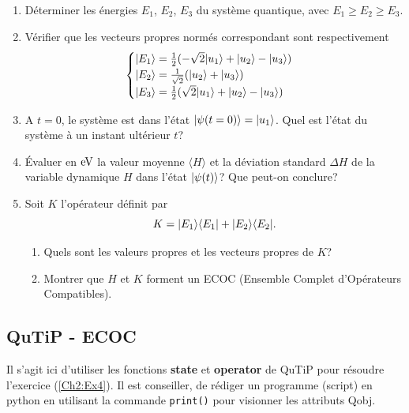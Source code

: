 \begin{enumerate}
\item Déterminer les énergies $E_1$, $E_{2}$, $E_3$ du système quantique,
avec $E_1\geq E_{2}\geq E_3$.

\item Vérifier que les vecteurs propres normés correspondant sont
respectivement%
\begin{equation}
\begin{cases}
\vert E_1\rangle=\frac{1}{2}(-\sqrt{2}\vert u_1\rangle +\vert u_{2}\rangle-\vert u_3\rangle) \\
\vert E_{2}\rangle=\frac{1}{\sqrt{2}}(\vert u_{2}\rangle+\vert u_3\rangle) \\
\vert E_3\rangle=\frac{1}{2}(\sqrt{2}\vert u_1\rangle +\vert u_{2}\rangle-\vert u_3\rangle)
\end{cases}
\end{equation}

\item A $t=0$, le système est dans l'état $\vert\psi(t=0)\rangle=\vert u_1\rangle$. Quel
est l'état du système à un instant ultérieur $t$?

\item Évaluer en $\operatorname{eV}$ la valeur moyenne $\langle H\rangle$ et la
déviation standard $\Delta H$ de la variable dynamique $H$ dans l'état
$\vert\psi(t)\rangle$? Que peut-on conclure?

\item Soit $K$ l'opérateur définit par%
\begin{equation}
K=\vert E_1\rangle\langle E_1\vert +\vert E_{2}\rangle\langle E_{2}\vert.
\end{equation}

\begin{enumerate}
\item Quels sont les valeurs propres et les vecteurs propres de $K$?

\item Montrer que $H$ et $K$ forment un ECOC (Ensemble Complet d'Opérateurs
Compatibles).
\end{enumerate}
\end{enumerate}

\subsection{QuTiP - ECOC}

Il s'agit ici d'utiliser les fonctions \textbf{state} et \textbf{operator} de
QuTiP pour résoudre l'exercice (\ref{Ch2:Ex4}). Il est  conseiller, de rédiger
un programme (script) en python en utilisant la commande \texttt{print()} pour
visionner les attributs Qobj.

